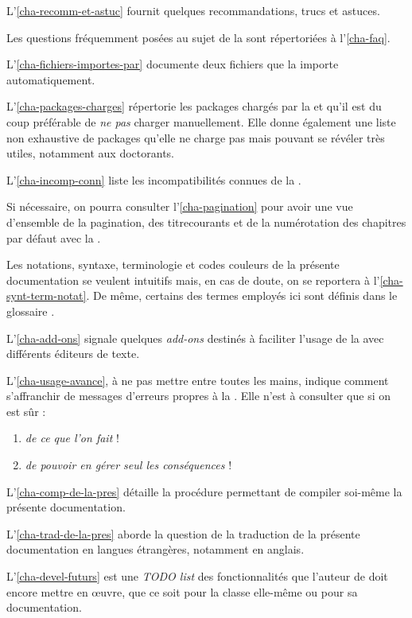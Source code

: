 L'\vref{cha-recomm-et-astuc} fournit quelques recommandations, trucs et astuces.

Les questions fréquemment posées au sujet de la \yatCl{} sont répertoriées
à l'\vref{cha-faq}.

L'\vref{cha-fichiers-importes-par} documente deux fichiers que la \yatCl{}
importe automatiquement.

L'\vref{cha-packages-charges} répertorie les packages chargés par la \yatCl{} et
qu'il est du coup préférable de \emph{ne pas} charger manuellement. Elle donne
également une liste non exhaustive de packages qu'elle ne charge pas mais
pouvant se révéler très utiles, notamment aux doctorants.

L'\vref{cha-incomp-conn} liste les incompatibilités connues de la \yatCl{}.

Si nécessaire, on pourra consulter l'\vref{cha-pagination} pour avoir une vue
d'ensemble de la \gls{pagination}, des \glspl{titrecourant} et de la
numérotation des chapitres par défaut avec la \yatCl{}.

Les notations, syntaxe, terminologie et codes couleurs de la présente
documentation se veulent intuitifs mais, en cas de doute, on se reportera
à l'\vref{cha-synt-term-notat}. De même, certains des termes employés ici sont
définis dans le glossaire .

L'\vref{cha-add-ons} signale quelques \emph{add-ons} destinés à faciliter
l'usage de la \yatCl{} avec différents éditeurs de texte.

L'\vref{cha-usage-avance}, à ne pas mettre entre toutes les mains, indique
comment s'affranchir de messages d'erreurs propres à la \yatCl{}. Elle n'est
à consulter que si on est sûr :
\begin{enumerate}
\item \emph{de ce que l'on fait} !
\item \emph{de pouvoir en gérer \emph{seul} les conséquences} !
\end{enumerate}

L'\vref{cha-comp-de-la-pres} détaille la procédure permettant de compiler
soi-même la présente documentation.

L'\vref{cha-trad-de-la-pres} aborde la question de la traduction de la présente
documentation en langues étrangères, notamment en anglais.

L'\vref{cha-devel-futurs} est une \emph{TODO list} des fonctionnalités que
l'auteur de \yatcl{} doit encore mettre en œuvre, que ce soit pour la classe
elle-même ou pour sa documentation.

